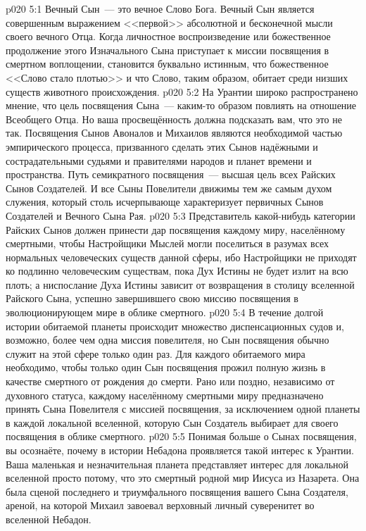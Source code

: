 \vs p020 5:1 Вечный Сын~--- это вечное Слово Бога. Вечный Сын является совершенным выражением <<первой>> абсолютной и бесконечной мысли своего вечного Отца. Когда личностное воспроизведение или божественное продолжение этого Изначального Сына приступает к миссии посвящения в смертном воплощении, становится буквально истинным, что божественное <<Слово стало плотью>> и что Слово, таким образом, обитает среди низших существ животного происхождения.
\vs p020 5:2 На Урантии широко распространено мнение, что цель посвящения Сына~--- каким\hyp{}то образом повлиять на отношение Всеобщего Отца. Но ваша просвещённость должна подсказать вам, что это не так. Посвящения Сынов Авоналов и Михаилов являются необходимой частью эмпирического процесса, призванного сделать этих Сынов надёжными и сострадательными судьями и правителями народов и планет времени и пространства. Путь семикратного посвящения~--- высшая цель всех Райских Сынов Создателей. И все Сыны Повелители движимы тем же самым духом служения, который столь исчерпывающе характеризует первичных Сынов Создателей и Вечного Сына Рая.
\vs p020 5:3 Представитель какой\hyp{}нибудь категории Райских Сынов должен принести дар посвящения каждому миру, населённому смертными, чтобы Настройщики Мыслей могли поселиться в разумах всех нормальных человеческих существ данной сферы, ибо Настройщики не приходят ко  подлинно человеческим существам, пока Дух Истины не будет излит на всю плоть; а ниспослание Духа Истины зависит от возвращения в столицу вселенной Райского Сына, успешно завершившего свою миссию посвящения в эволюционирующем мире в облике смертного.
\vs p020 5:4 В течение долгой истории обитаемой планеты происходит множество диспенсационных судов и, возможно, более чем одна миссия повелителя, но Сын посвящения обычно служит на этой сфере только один раз. Для каждого обитаемого мира необходимо, чтобы только один Сын посвящения прожил полную жизнь в качестве смертного от рождения до смерти. Рано или поздно, независимо от духовного статуса, каждому населённому смертными миру предназначено принять Сына Повелителя с миссией посвящения, за исключением одной планеты в каждой локальной вселенной, которую Сын Создатель выбирает для своего посвящения в облике смертного.
\vs p020 5:5 \pc Понимая больше о Сынах посвящения, вы осознаёте, почему в истории Небадона проявляется такой интерес к Урантии. Ваша маленькая и незначительная планета представляет интерес для локальной вселенной просто потому, что это смертный родной мир Иисуса из Назарета. Она была сценой последнего и триумфального посвящения вашего Сына Создателя, ареной, на которой Михаил завоевал верховный личный суверенитет во вселенной Небадон.
